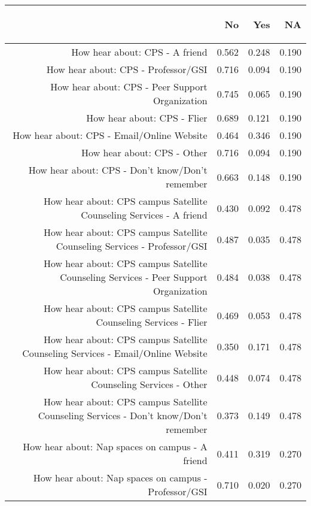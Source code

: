 \documentclass{article}\usepackage[]{graphicx}\usepackage[]{color}
\begin{document}
\begin{table}[ht]
\centering
\begin{tabular}{rrrr}
  \hline
 & \begin{sideways} No \end{sideways} & \begin{sideways} Yes \end{sideways} & \begin{sideways} NA \end{sideways} \\ 
  \hline
How hear about: CPS - A friend & 0.562 & 0.248 & 0.190 \\ 
  How hear about: CPS - Professor/GSI & 0.716 & 0.094 & 0.190 \\ 
  How hear about: CPS - Peer Support Organization & 0.745 & 0.065 & 0.190 \\ 
  How hear about: CPS - Flier & 0.689 & 0.121 & 0.190 \\ 
  How hear about: CPS - Email/Online Website & 0.464 & 0.346 & 0.190 \\ 
  How hear about: CPS - Other & 0.716 & 0.094 & 0.190 \\ 
  How hear about: CPS - Don't know/Don't remember & 0.663 & 0.148 & 0.190 \\ 
  How hear about: CPS campus Satellite Counseling Services - A friend & 0.430 & 0.092 & 0.478 \\ 
  How hear about: CPS campus Satellite Counseling Services - Professor/GSI & 0.487 & 0.035 & 0.478 \\ 
  How hear about: CPS campus Satellite Counseling Services - Peer Support Organization & 0.484 & 0.038 & 0.478 \\ 
  How hear about: CPS campus Satellite Counseling Services - Flier & 0.469 & 0.053 & 0.478 \\ 
  How hear about: CPS campus Satellite Counseling Services - Email/Online Website & 0.350 & 0.171 & 0.478 \\ 
  How hear about: CPS campus Satellite Counseling Services - Other & 0.448 & 0.074 & 0.478 \\ 
  How hear about: CPS campus Satellite Counseling Services - Don't know/Don't remember & 0.373 & 0.149 & 0.478 \\ 
  How hear about: Nap spaces on campus - A friend & 0.411 & 0.319 & 0.270 \\ 
  How hear about: Nap spaces on campus - Professor/GSI & 0.710 & 0.020 & 0.270 \\ 

\end{tabular}
\end{table}
\end{document}
